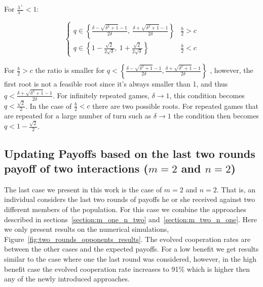 \documentclass[11pt]{article}
\theoremstyle{plainCl1}
\theoremstyle{plainCl2}
\begin{document}
For \(\frac{\lambda^{+}}{\lambda^{-}} < 1\):

\begin{equation}
\begin{cases}
  q \in \left\{\frac{\delta - \sqrt{\delta^{2} + 1} - 1}{2 \delta}, \  \frac{\delta + \sqrt{\delta^{2} + 1} - 1}{2 \delta}\right\}  & \frac{b}{2} > c \\[0.5cm]
  q \in \left\{1 - \frac{\sqrt{2}}{2 \sqrt{\delta}}, \  1 + \frac{\sqrt{2}}{2 \sqrt{\delta}}\right\} & \frac{b}{2} < c
\end{cases}
\end{equation}

For \(\frac{b}{2}>c\) the ratio is smaller for
\(q < \left\{\frac{\delta - \sqrt{\delta^{2} + 1} - 1}{2 \delta}, \frac{\delta + \sqrt{\delta^{2} + 1} - 1}{2 \delta}\right\}\)
, however, the first root is not a feasible root since it's always smaller
than 1, and thus \(q < \frac{\delta + \sqrt{\delta^{2} + 1} - 1}{2 \delta}\). For
infinitely repeated games, \(\delta \rightarrow 1\), this condition becomes \(q
< \frac{\sqrt{2}}{2}\). In the case of \(\frac{b}{2}<c\) there are two possible
roots. For repeated games that are repeated for a large number of turn such as
\(\delta \rightarrow 1\) the condition then becomes \(q < 1 -
\frac{\sqrt{2}}{2}\).

\subsection{Updating Payoffs based on the last two rounds payoff of two interactions (\(m=2\) and \(n=2\))}

The last case we present in this work is the case of \(m = 2\) and \(n = 2\).
That is, an individual considers the last two rounds of payoffs he or she
received against two different members of the population. For this case we
combine the approaches described in sections~\ref{section:m_one_n_two}
and~\ref{section:m_two_n_one}. Here we only present results on the numerical
simulations, Figure~\ref{fig:two_rounds_opponents_results}. The evolved
cooperation rates are between the other cases and the expected payoffs. For a
low benefit we get results similar to the case where one the last round was
considered, however, in the high benefit case the evolved cooperation rate
increases to 91\% which is higher then any of the newly introduced approaches.
\end{document}
